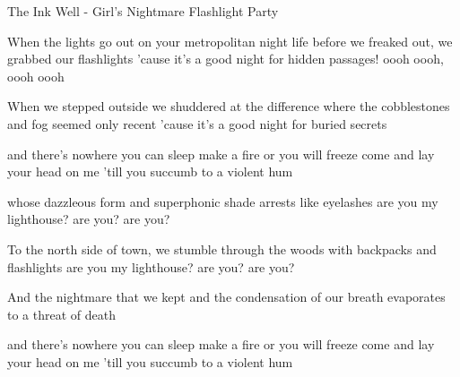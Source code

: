 The Ink Well - Girl's Nightmare Flashlight Party

When the lights go out on your metropolitan night life
before we freaked out, we grabbed our flashlights
'cause it's a good night for hidden passages!
oooh oooh, oooh oooh

When we stepped outside we shuddered at the difference
where the cobblestones and fog seemed only recent
'cause it's a good night for buried secrets

and there's nowhere you can sleep
make a fire or you will freeze
come and lay your head on me
'till you succumb to a violent hum

whose dazzleous form and superphonic shade 
arrests like eyelashes
are you my lighthouse? are you? are you?

To the north side of town, we stumble through the woods
with backpacks and flashlights
are you my lighthouse? are you? are you?

And the nightmare that we kept and the condensation of our breath
evaporates to a threat of death

and there's nowhere you can sleep
make a fire or you will freeze
come and lay your head on me
'till you succumb to a violent hum

